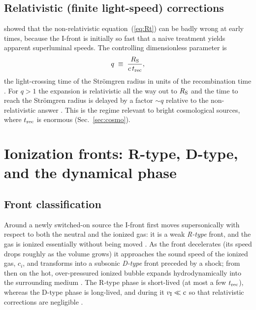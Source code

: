 \documentclass[11pt,a4paper]{article}
\begin{document}
\subsection{Relativistic (finite light-speed) corrections}
\citet{Shapiro2006} showed that the non-relativistic equation~(\ref{eq:Rt}) can be badly wrong at
early times, because the I-front is initially so fast that a naive treatment yields apparent
superluminal speeds. The controlling dimensionless parameter is
\begin{equation}
  q \;\equiv\; \frac{R_{\rm S}}{c\,t_{\rm rec}},
  \label{eq:q}
\end{equation}
the light-crossing time of the Str\"omgren radius in units of the recombination time
\citep{Shapiro2006}. For $q>1$ the expansion is relativistic all the way out to $R_{\rm S}$ and the
time to reach the Str\"omgren radius is delayed by a factor $\sim q$ relative to the non-relativistic
answer \citep{Shapiro2006}. This is the regime relevant to bright cosmological sources, where
$t_{\rm rec}$ is enormous (Sec.~\ref{sec:cosmo}).

\section{Ionization fronts: R-type, D-type, and the dynamical phase}
\label{sec:fronts}

\subsection{Front classification}
Around a newly switched-on source the I-front first moves supersonically with respect to both the
neutral and the ionized gas: it is a weak \emph{R-type} front, and the gas is ionized essentially
without being moved \citep{Shapiro2006}. As the front decelerates (its speed drops roughly as the
volume grows) it approaches the sound speed of the ionized gas, $c_i$, and transforms into a subsonic
\emph{D-type} front preceded by a shock; from then on the hot, over-pressured ionized bubble expands
hydrodynamically into the surrounding medium \citep{Shapiro2006}. The R-type phase is short-lived
(at most a few $t_{\rm rec}$), whereas the D-type phase is long-lived, and during it $v_{\rm
I}\ll c$ so that relativistic corrections are negligible \citep{Shapiro2006}.
\end{document}
